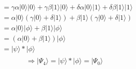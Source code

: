 \documentclass{article}
\begin{document}
\begin{equation}
\begin{split}
    & = \gamma\alpha|0\rangle|0\rangle + \gamma\beta|1\rangle|0\rangle
        + \delta\alpha|0\rangle|1\rangle + \delta\beta|1\rangle|1\rangle \\
    & = \alpha|0\rangle(\gamma|0\rangle + \delta|1\rangle)
        + \beta|1\rangle(\gamma|0\rangle + \delta|1\rangle) \\
    & = \alpha|0\rangle|\phi\rangle + \beta|1\rangle|\phi\rangle \\
    & = (\alpha|0\rangle + \beta|1\rangle)|\phi\rangle \\
    & = |\psi\rangle * |\phi\rangle \\
\end{split}
\end{equation}
\begin{equation}
    \Longrightarrow |\Psi_4\rangle = |\psi\rangle * |\phi\rangle = |\Psi_0\rangle
\end{equation}
\end{document}
